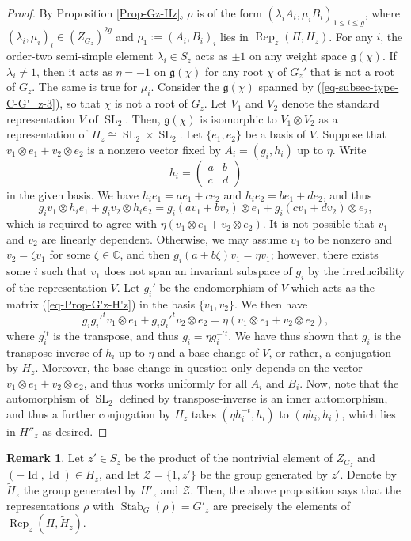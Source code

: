 \documentclass[11pt,oneside,dvipsnames]{amsart}
\theoremstyle{plain}
\theoremstyle{definition}
\newtheorem{Rem}[Thm]{Remark}
\theoremstyle{named}
\DeclareMathOperator{\Id}{Id}
\DeclareMathOperator{\Rep}{Rep}
\DeclareMathOperator{\SL}{SL}
\DeclareMathOperator{\Stab}{Stab}
\begin{document}
\begin{proof}
By Proposition \ref{Prop-Gz-Hz}, $\rho$ is of the form $(\lambda_iA_i,\mu_iB_i)_{1\le i\le g}$, where $(\lambda_i,\mu_i)_i\in (Z_{G_z})^{2g}$ and $\rho_1:=(A_i,B_i)_i$ lies in $\Rep_z(\Pi,H_z)$. For any $i$, the order-two semi-simple element $\lambda_i\in S_z$ acts as $\pm 1$ on any weight space $\mathfrak{g}(\chi)$. If $\lambda_i\ne 1$, then it acts as $\eta=-1$ on $\mathfrak{g}(\chi)$ for any root $\chi$ of $G_z'$ that is not a root of $G_z$. The same is true for $\mu_i$. Consider the $\mathfrak{g}(\chi)$ spanned by (\ref{eq-subsec-type-C-G'_z-3}), so that $\chi$ is not a root of $G_z$. Let $V_1$ and $V_2$ denote the standard representation $V$ of $\SL_2$. Then, $\mathfrak{g}(\chi)$ is isomorphic to $V_1\otimes V_2$ as a representation of $H_z\cong\SL_2\times\SL_2$. Let $\{e_1,e_2\}$ be a basis of $V$. Suppose that $v_1\otimes e_1+v_2\otimes e_2$ is a nonzero vector fixed by $A_i=(g_i,h_i)$ up to $\eta$. Write
\begin{equation}\label{eq-Prop-G'z-H'z}
h_i=\left(
\begin{array}{cc}
a & b\\
c & d
\end{array}
\right)
\end{equation}
in the given basis. We have $h_ie_1=ae_1+ce_2$ and $h_ie_2=be_1+de_2$, and thus
$$
g_iv_1\otimes h_ie_1+g_iv_2\otimes h_ie_2=g_i(av_1+bv_2)\otimes e_1+g_i(cv_1+dv_2)\otimes e_2,
$$
which is required to agree with $\eta(v_1\otimes e_1+v_2\otimes e_2)$. It is not possible that $v_1$ and $v_2$ are linearly dependent. Otherwise, we may assume $v_1$ to be nonzero and $v_2=\zeta v_1$ for some $\zeta\in\mathbb{C}$, and then $g_i(a+b\zeta)v_1=\eta v_1$; however, there exists some $i$ such that $v_1$ does not span an invariant subspace of $g_i$ by the irreducibility of the representation $V$. Let $g_i'$ be the endomorphism of $V$ which acts as the matrix (\ref{eq-Prop-G'z-H'z}) in the basis $\{v_1,v_2\}$. We then have
$$
g_ig_i'^tv_1\otimes e_1+g_ig_i'^tv_2\otimes e_2=\eta (v_1\otimes e_1+v_2\otimes e_2),
$$ 
where $g_i^{\prime t}$ is the transpose, and thus $g_i=\eta g_i^{-\prime t}$. We have thus shown that $g_i$ is the transpose-inverse of $h_i$ up to $\eta$ and a base change of $V$, or rather, a conjugation by $H_z$. Moreover, the base change in question only depends on the vector $v_1\otimes e_1+v_2\otimes e_2$, and thus works uniformly for all $A_i$ and $B_i$. Now, note that the automorphism of $\SL_2$ defined by transpose-inverse is an inner automorphism, and thus a further conjugation by $H_z$ takes $(\eta h_i^{-t},h_i)$ to $(\eta h_i,h_i)$, which lies in $H''_z$ as desired.
\end{proof}
\begin{Rem}\label{Rem-G'z-H'z}
Let $z'\in S_z$ be the product of the nontrivial element of $Z_{G_z}$ and $(-\Id,\Id)\in H_z$, and let $\mathscr{Z}=\{1,z'\}$ be the group generated by $z'$. Denote by $\tilde{H}_z$ the group generated by $H'_z$ and $\mathscr{Z}$. Then, the above proposition says that the representations $\rho$ with $\Stab_G(\rho)=G'_z$ are precisely the elements of $\Rep_z(\Pi,\tilde{H}_z)$.  
\end{Rem}
\end{document}
